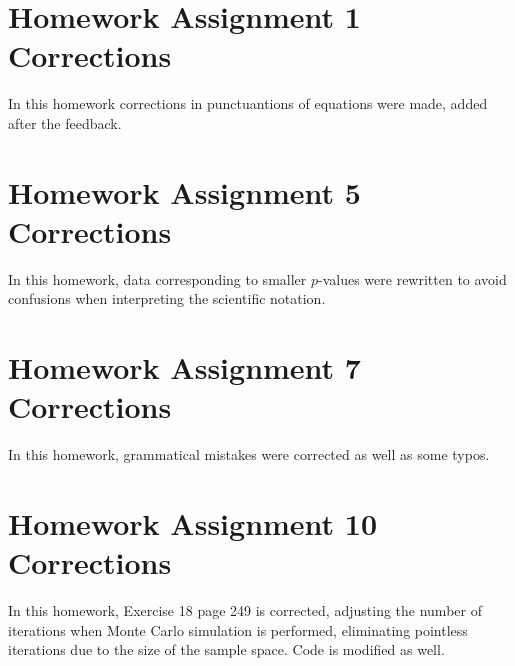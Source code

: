 \documentclass[10pt,leter,openany]{article}
\begin{document}
	
	
	
\section*{Homework Assignment 1 Corrections}
	In this homework corrections in punctuantions of equations were made, added after the feedback. 
	
	
	
	
	
	
	
	
\section*{Homework Assignment 5 Corrections}
	In this homework, data corresponding to smaller $p$-values were rewritten to avoid confusions when interpreting the scientific notation.
	
	
	
	

\section*{Homework Assignment 7 Corrections}
	In this homework, grammatical mistakes were corrected as well as some typos.
	
	
	
	
	
		
		
\section*{Homework Assignment 10 Corrections}
	In this homework, Exercise 18 page 249 is corrected, adjusting the number of iterations when  Monte Carlo simulation is performed, eliminating pointless iterations due to the size of the sample space. Code is modified as well.
	
\end{document}
